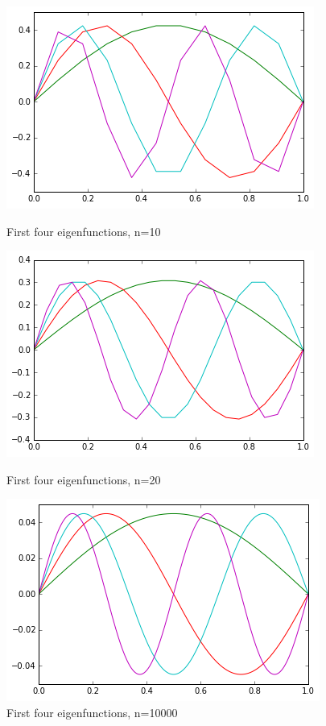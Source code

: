 \documentclass[12pt,]{book}
\begin{document}
\begin{figure}[h]
\includegraphics[width=\textwidth]{graphics/1_5_eigenvectors_23_1.png}
\caption{First four eigenfunctions, n=10}
\endminipage\hfill
{}
\centering
\includegraphics[width=\textwidth]{graphics/1_5_eigenvectors_24_1.png}
\caption{First four eigenfunctions, n=20}
\endminipage\hfill
{}
\includegraphics[width=\textwidth]{graphics/1_5_eigenvectors_25_1.png}
\caption{First four eigenfunctions, n=10000}
\endminipage\hfill
\end{figure}
\end{document}
